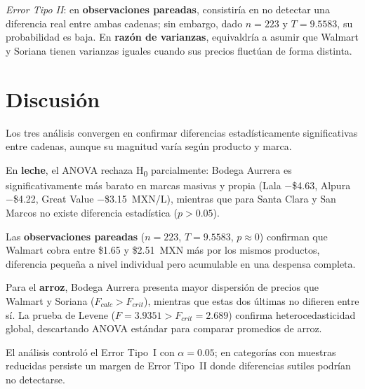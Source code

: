 \documentclass[aps, twocolumn, 11pt]{revtex4-2}
\begin{document}
\textit{Error Tipo II}: en \textbf{observaciones pareadas}, consistiría en no detectar una diferencia real entre ambas cadenas; sin embargo, dado $n = 223$ y $T = 9.5583$, su probabilidad es baja. En \textbf{razón de varianzas}, equivaldría a asumir que Walmart y Soriana tienen varianzas iguales cuando sus precios fluctúan de forma distinta.

\section{Discusión}

Los tres análisis convergen en confirmar diferencias estadísticamente significativas entre
cadenas, aunque su magnitud varía según producto y marca.

En \textbf{leche}, el ANOVA rechaza H\textsubscript{0} parcialmente: Bodega Aurrera es
significativamente más barato en marcas masivas y propia (Lala $-$\$4.63, Alpura
$-$\$4.22, Great Value $-$\$3.15~MXN/L), mientras que para Santa Clara y San Marcos
no existe diferencia estadística ($p > 0.05$).

Las \textbf{observaciones pareadas} ($n = 223$, $T = 9.5583$, $p \approx 0$) confirman
que Walmart cobra entre \$1.65 y \$2.51~MXN más por los mismos productos, diferencia
pequeña a nivel individual pero acumulable en una despensa completa.

Para el \textbf{arroz}, Bodega Aurrera presenta mayor dispersión de precios que Walmart
y Soriana ($F_{calc} > F_{crit}$), mientras que estas dos últimas no difieren entre sí. La
prueba de Levene ($F = 3.9351 > F_{crit} = 2.689$) confirma heterocedasticidad global,
descartando ANOVA estándar para comparar promedios de arroz.

El análisis controló el Error Tipo~I con $\alpha = 0.05$; en categorías con muestras
reducidas persiste un margen de Error Tipo~II donde diferencias sutiles podrían no
detectarse.



\end{document}
